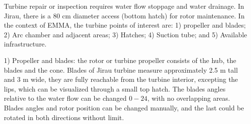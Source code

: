 Turbine repair or inspection requires water flow stoppage and water drainage. In
Jirau, there is a 80 cm diameter access (bottom hatch) for rotor maintenance. In
the context of EMMA, the turbine points of interest are: 1) propeller and
blades; 2) Arc chamber and adjacent areas; 3) Hatches; 4) Suction tube; and 5)
Available infrastructure.


1) Propeller and blades: the rotor or turbine propeller consists of the hub, the
blades and the cone. Blades of Jirau turbine measure approximately 2.5 m tall
and 3 m wide, they are fully reachable from the turbine interior, excepting
the lips, which can be visualized through a small top hatch. The blades angles
relative to the water flow can be changed $0 - 24$, with no overlapping areas.
Blades angles and rotor position can be changed manually, and the last could be
rotated in both directions without limit.

